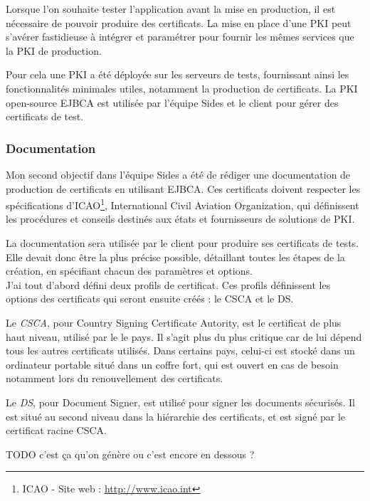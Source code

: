 Lorsque l'on souhaite tester l'application avant la mise en production, il est nécessaire de pouvoir produire des certificats.
La mise en place d'une PKI peut s'avérer fastidieuse à intégrer et paramétrer pour fournir les mêmes services que la PKI de production.

Pour cela une PKI a été déployée sur les serveurs de tests, fournissant ainsi les fonctionnalités minimales utiles, notamment la production de certificats.
La PKI open-source EJBCA est utilisée par l'équipe Sides et le client pour gérer des certificats de test.


\subsubsection{Documentation}

Mon second objectif dans l'équipe Sides a été de rédiger une documentation de production de certificats en utilisant EJBCA.
Ces certificats doivent respecter les spécifications d'ICAO\footnote{ICAO - Site web : \url{http://www.icao.int}}, International Civil Aviation Organization, qui définissent les procédures et conseils destinés aux états et fournisseurs de solutions de PKI.

La documentation sera utilisée par le client pour produire ses certificats de tests.
Elle devait donc être la plus précise possible, détaillant toutes les étapes de la création, en spécifiant chacun des paramètres et options.
\\

J'ai tout d'abord défini deux profils de certificat.
Ces profils définissent les options des certificats qui seront ensuite créés : le CSCA et le DS.

Le \textit{CSCA}, pour Country Signing Certificate Autority, est le certificat de plus haut niveau, utilisé par le le pays.
Il s'agit plus du plus critique car de lui dépend tous les autres certificats utilisés.
Dans certains pays, celui-ci est stocké dans un ordinateur portable situé dans un coffre fort, qui est ouvert en cas de besoin notamment lors du renouvellement des certificats.

Le \textit{DS}, pour Document Signer, est utilisé pour signer les documents sécurisés.
Il est situé au second niveau dans la hiérarchie des certificats, et est signé par le certificat racine CSCA.

TODO c'est ça qu'on génère ou c'est encore en dessous ?

